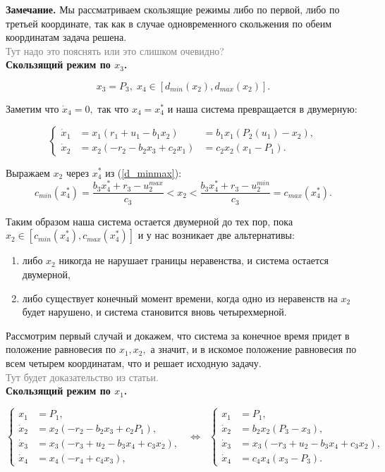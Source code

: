 \documentclass[11pt]{article}
\newcommand\Ref[1]{(\ref{#1})}
\newcommand\beq{\begin{equation}}
\newcommand\eeq{\end{equation}}
\begin{document}
{\bf Замечание.} Мы рассматриваем скользящие режимы либо по первой, либо по третьей координате, так как в случае одновременного скольжения по обеим координатам задача решена. \\
\textcolor{gray}{Тут надо это пояснять или это слишком очевидно?}\\

{\bf Скользящий режим по $x_3$.}

\beq
\label{d_minmax}
	x_3 = P_3, \; x_4 \in [d_{min}(x_2), d_{max}(x_2)].
\eeq

Заметим что $\dot x_4 = 0,$ так что $x_4 = x_4^*$ и наша система превращается в двумерную:

$$
\left\{
\begin{aligned}
	\dot x_1 &= x_1(r_1 + u_1- b_1x_2) &= b_1x_1(P_2(u_1) - x_2), \\
	\dot x_2 &= x_2(-r_2 - b_2x_3 + c_2x_1) &= c_2x_2(x_1 - P_1).
\end{aligned}
\right.
$$

Выражаем $x_2$ через $x_4^*$ из \Ref{d_minmax}:
$$c_{min}(x_4^*) = \frac{b_3x_4^* + r_3 - u_2^{max}}{c_3} < x_2 < \frac{b_3x_4^* + r_3 - u_2^{min}}{c_3} = c_{max}(x_4^*).$$

Таким образом наша система остается двумерной до тех пор, пока $x_2 \in [c_{min}(x_4^*), c_{max}(x_4^*)]$ и у нас возникает две альтернативы:
\begin{enumerate}
	\item либо $x_2$ никогда не нарушает границы неравенства, и система остается двумерной,
	\item либо существует конечный момент времени, когда одно из неравенств на $x_2$ будет нарушено, и система становится вновь четырехмерной.
\end{enumerate}

Рассмотрим первый случай и докажем, что система за конечное время придет в положение равновесия по $x_1, x_2,$ а значит, и в искомое положение равновесия по всем четырем координатам, что и решает исходную задачу. \\

\textcolor{gray}{Тут будет доказательство из статьи.}\\

{\bf Скользящий режим по $x_1$.}

\beq
\left\{
\begin{aligned}
	x_1 &= P_1, \\
	\dot x_2 &= x_2(-r_2 - b_2x_3 + c_2P_1), \\
	\dot x_3 &= x_3(-r_3 + u_2 - b_3x_4 + c_3x_2), \\
	\dot x_4 &= x_4(-r_4 + c_4x_3), 
\end{aligned}
\right. \;\; \Leftrightarrow \;\;
\left\{
\begin{aligned}
	x_1 &= P_1, \\
	\dot x_2 &= b_2x_2(P_3 - x_3), \\
	\dot x_3 &= x_3(-r_3 + u_2 - b_3x_4 + c_3x_2), \\
	\dot x_4 &= c_4x_4(x_3 - P_3). 	
\end{aligned}
\label{system1}
\right.
\eeq
\end{document}
